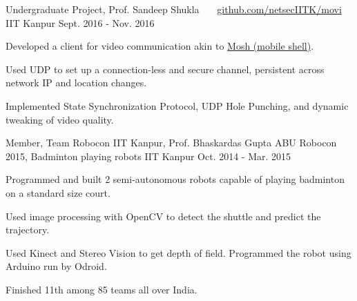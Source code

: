 \begin{cventries}
  \cventry
  {Undergraduate Project, Prof. Sandeep Shukla}
  {\href{https://github.com/netsecIITK/moVi}{}
    \ \ \ \normalfont\href{https://github.com/netsecIITK/moVi}
    {github.com/netsecIITK/movi}}
  {IIT Kanpur}
  {Sept. 2016 - Nov. 2016}
  {
    \begin{cvitems}
    \item Developed a client for video communication
      akin to \href{https://mosh.org/}{Mosh (mobile shell)}.
    \item Used UDP to set up a connection-less and secure channel,
      persistent across network IP and location changes.
    \item Implemented State Synchronization Protocol, UDP Hole
      Punching, and dynamic tweaking of video quality.
    \end{cvitems}
  }

  \cventry
  {Member, Team Robocon IIT Kanpur, Prof. Bhaskardas Gupta}
  {ABU Robocon 2015, Badminton playing robots}
  {IIT Kanpur}
  {Oct. 2014 - Mar. 2015}
  {
    \begin{cvitems}
    \item Programmed and built 2 semi-autonomous robots
      capable of playing badminton on a standard size court.
    \item Used image processing with OpenCV to detect the shuttle
      and predict the trajectory.
    \item Used Kinect and Stereo Vision to get depth of
      field. Programmed the robot using Arduino run by Odroid.
    \item Finished 11th among 85 teams all over India.
    \end{cvitems}
  }

\end{cventries}


